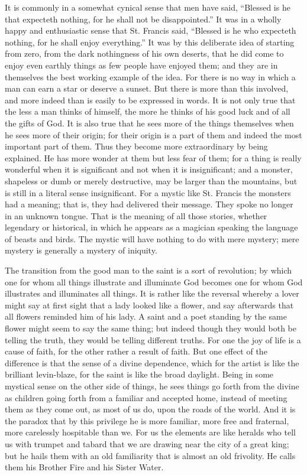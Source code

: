 \documentclass{book}
\begin{document}
It is commonly in a somewhat cynical sense that men have said, “Blessed is he that expecteth nothing, for he shall not be disappointed.” It was in a wholly happy and enthusiastic sense that St. Francis said, “Blessed is he who expecteth nothing, for he shall enjoy everything.” It was by this deliberate idea of starting from zero, from the dark nothingness of his own deserts, that he did come to enjoy even earthly things as few people have enjoyed them; and they are in themselves the best working example of the idea. For there is no way in which a man can earn a star or deserve a sunset. But there is more than this involved, and more indeed than is easily to be expressed in words. It is not only true that the less a man thinks of himself, the more he thinks of his good luck and of all the gifts of God. It is also true that he sees more of the things themselves when he sees more of their origin; for their origin is a part of them and indeed the most important part of them. Thus they become more extraordinary by being explained. He has more wonder at them but less fear of them; for a thing is really wonderful when it is significant and not when it is insignificant; and a monster, shapeless or dumb or merely destructive, may be larger than the mountains, but is still in a literal sense insignificant. For a mystic like St. Francis the monsters had a meaning; that is, they had delivered their message. They spoke no longer in an unknown tongue. That is the meaning of all those stories, whether legendary or historical, in which he appears as a magician speaking the language of beasts and birds. The mystic will have nothing to do with mere mystery; mere mystery is generally a mystery of iniquity.

The transition from the good man to the saint is a sort of revolution; by which one for whom all things illustrate and illuminate God becomes one for whom God illustrates and illuminates all things. It is rather like the reversal whereby a lover might say at first sight that a lady looked like a flower, and say afterwards that all flowers reminded him of his lady. A saint and a poet standing by the same flower might seem to say the same thing; but indeed though they would both be telling the truth, they would be telling different truths. For one the joy of life is a cause of faith, for the other rather a result of faith. But one effect of the difference is that the sense of a divine dependence, which for the artist is like the brilliant levin-blaze, for the saint is like the broad daylight. Being in some mystical sense on the other side of things, he sees things go forth from the divine as children going forth from a familiar and accepted home, instead of meeting them as they come out, as most of us do, upon the roads of the world. And it is the paradox that by this privilege he is more familiar, more free and fraternal, more carelessly hospitable than we. For us the elements are like heralds who tell us with trumpet and tabard that we are drawing near the city of a great king; but he hails them with an old familiarity that is almost an old frivolity. He calls them his Brother Fire and his Sister Water.
\end{document}
